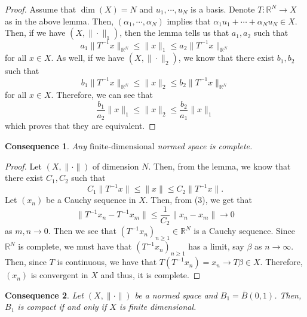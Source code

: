 \documentclass[oneside]{book}
\newtheorem{cons}{Consequence}
\newcommand{\R}{{\mathbb R}}
\newcommand{\fd}{{\text{finite-dimensional}}}
\begin{document}
\begin{proof}
Assume that $\dim(X) = N$ and $u_1, \cdots, u_N$ is a basis. Denote $T: \R^N \to X$ as in the above lemma. Then, $(\alpha_1, \cdots, \alpha_N)$ implies that $\alpha_1 u_1 + \cdots + \alpha_N u_N \in X$. Then, if we have $(X, \| \cdot \|_1)$, then the lemma tells us that $a_1, a_2$ such that 
\[a_1 \| T^{-1} x \|_{\R^N} \leq \| x \|_1 \leq a_2 \| T^{-1} x \|_{\R^N}\]
for all $x \in X$. As well, if we have $(X, \| \cdot \|_2)$, we know that there exist $b_1, b_2 $ such that 
\[ b_1 \| T^{-1} x \|_{\R^N} \leq \| x \|_2 \leq b_2 \| T^{-1} x \|_{\R^N}\]
for all $x \in X$. Therefore, we can see that 
\[ \frac{b_1}{a_2} \| x \|_1 \leq \| x \|_2 \leq \frac{b_2}{a_1} \| x \|_1\]
which proves that they are equivalent.
\end{proof}
\begin{cons}
Any $\fd$ normed space is complete. 
\end{cons}
\begin{proof}
Let $(X, \| \cdot \| )$ of dimension $N$. Then, from the lemma, we know that there exist $C_1, C_2$ such that
\begin{equation}
C_1 \| T^{-1} x \| \leq \| x \| \leq C_2 \| T^{-1}x \|.
\end{equation}
Let $(x_n)$ be a Cauchy sequence in $X$. Then, from (3), we get that 
\[ \| T^{-1}x_n - T^{-1} x_m \| \leq \frac{1}{C_2} \| x_n - x_m \| \to 0 \]
as $m, n \to 0$. Then we see that $(T^{-1} x_n)_{n \geq 1} \in \R^N$ is a Cauchy sequence. Since $\R^N$ is complete, we must have that $(T^{-1} x_n)_{n \geq 1} $ has a limit, say $\beta$ as $n \to \infty$. Then, since $T$ is continuous, we have that $T(T^{-1} x_n) = x_n \to T\beta \in X$. Therefore, $(x_n)$ is convergent in $X$ and thus, it is complete. 
\end{proof}
\begin{cons}
Let $(X, \| \cdot \|)$ be a normed space and $B_1 = \overline{B}(0, 1)$. Then, $B_1$ is compact if and only if $X$ is finite dimensional. 
\end{cons}
\end{document}

